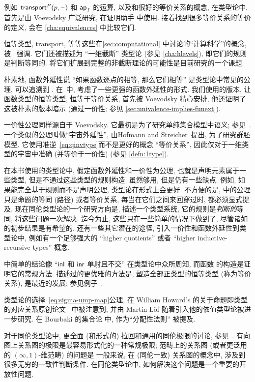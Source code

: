 %
例如 $\mathsf{transport}^{P}(p,\mathord{\hspace{1pt}\text{--}\hspace{1pt}})$ 和 $\mathsf{ap}_{f}$ 的运算, 以及和很好的等价关系的概念, 在类型论中, 首先是由 Voevodsky 广泛研究, 在证明助手 \Coq 中使用.
接着找到很多等价关系的等价的定义, 会在 \cref{cha:equivalences} 中比较它们.

恒等类型, transport, 等等这些在\cref{sec:computational} 中讨论的``计算科学''的概念, 被~\cite{lh:canonicity} 强调.
它们还被描述为 ``一维截断'' 类型论 (参见 \cref{cha:hlevels}), 即它们的规则是判断等同的.
将它们扩展到完整的非截断理论的可能性是目前研究的一个课题.

%
朴素地, 函数外延性说 ``如果函数逐点的相等, 那么它们相等'' 是类型论中常见的公理, 可以追溯到 \cite{PM2}.
在~\cite{garner:depprod}中, 考虑了一些更强的函数外延性的形式.
我们使用的版本, 让函数类型的恒等类型, 恒等于等价关系, 首先被 Voevodsky 精心安排, 他还证明了这被朴素的版本暗示 (通过一价性; 参见 \cref{sec:univalence-implies-funext}).

%
一价性公理同样源自于 Voevodsky.
它最初是为了研究单纯集合模型中语义; 参见~\cite{klv:ssetmodel}.
一个类似的公理叫做``宇宙外延性'', 由Hofmann and Streicher~\cite{hs:gpd-typethy}提出, 为了研究群胚模型.
它使用准逆~\eqref{eq:qinvtype}而不是更好的概念 ``等价关系'', 因此仅对于一维类型的宇宙中准确 (并等价于一价性) (参见 \cref{defn:1type}).

在本书使用的类型论中, 假定函数外延性和一价性为公理, 也就是声明元素属于一些类型, 但是不通过这些类型的规则构造.
虽然够用, 但是仍有一些缺点.
例如, 如果能完全基于规则而不是声明公理, 类型论在形式上会更好.
不方便的是,  中的公理只是命题的等同 (路径) 或者等价关系, 每当在它们之间来回穿过时, 都必须显式提及.
现在同伦类型论的一个研究方向是, 描述一个类型系统, 它的规则是\emph{判断的}等同, 将这些问题一次解决.
迄今为止, 这些只在一些简单的情况下做到了, 尽管诸如~\cite{lh:canonicity} 的初步结果是有希望的.
还有一些其它潜在的途径, 引入一价性和函数外延性到类型论中, 例如有一个足够强大的 ``higher quotients'' 或者 ``higher inductive-recursive types'' 概念.

 中简单的结论像 ``${\mathsf{inl}}$ 和 ${\mathsf{inr}}$ 单射且不交'' 在类型论中众所周知, 而函数 \encode 的构造是证明它的常规方法.
描述过的更优雅的方法是, 塑造全部正类型的恒等类型 (称为等价关系), 是最近的发展; 参见例子~\cite{ls:pi1s1}.

%
类型论的选择~\eqref{eq:sigma-ump-map}公理, 在 William Howard's 的关于命题即类型的对应关系原创论文~\cite{howard:pat} 中被注意到, 并由 Martin-L\"of 随着引入他的依值类型论被进一步研究.
在 Bourbaki 的集合论 \cite{Bourbaki} 中, 作为``分配性法则'' 被提及.%

对于同伦类型论中, 更全面 (和形式的) 拉回和通用的同伦极限的讨论, 参见~\cite{AKL13}.
有向图上关系图的极限是最容易形式化的一种常规极限; 范畴上的关系图 (或者更泛用的 $(\infty,1)$-维范畴) 的问题是
%
%
一般来说, 在 (同伦一致) 关系图的概念中, 涉及到很多无穷的一致性判断条件.
在同伦类型论中, 如何解决这个问题是一个重要的开放性问题.
